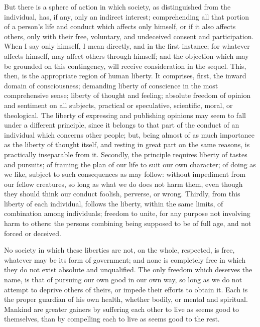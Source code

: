 \documentclass[11pt,openany]{book}
\begin{document}
But there is a sphere of action in which society, as distinguished from the individual, has, if any, only an indirect interest; comprehending all that portion of a person's life and conduct which affects only himself, or if it also affects others, only with their free, voluntary, and undeceived consent and participation. When I say only himself, I mean directly, and in the first instance; for whatever affects himself, may affect others through himself; and the objection which may be grounded on this contingency, will receive consideration in the sequel. This, then, is the appropriate region of human liberty. It comprises, first, the inward domain of consciousness; demanding liberty of conscience in the most comprehensive sense; liberty of thought and feeling; absolute freedom of opinion and sentiment on all subjects, practical or speculative, scientific, moral, or theological. The liberty of expressing and publishing opinions may seem to fall under a different principle, since it belongs to that part of the conduct of an individual which concerns other people; but, being almost of as much importance as the liberty of thought itself, and resting in great part on the same reasons, is practically inseparable from it. Secondly, the principle requires liberty of tastes and pursuits; of framing the plan of our life to suit our own character; of doing as we like, subject to such consequences as may follow: without impediment from our fellow creatures, so long as what we do does not harm them, even though they should think our conduct foolish, perverse, or wrong. Thirdly, from this liberty of each individual, follows the liberty, within the same limits, of combination among individuals; freedom to unite, for any purpose not involving harm to others: the persons combining being supposed to be of full age, and not forced or deceived.

No society in which these liberties are not, on the whole, respected, is free, whatever may be its form of government; and none is completely free in which they do not exist absolute and unqualified. The only freedom which deserves the name, is that of pursuing our own good in our own way, so long as we do not attempt to deprive others of theirs, or impede their efforts to obtain it. Each is the proper guardian of his own health, whether bodily, or mental and spiritual. Mankind are greater gainers by suffering each other to live as seems good to themselves, than by compelling each to live as seems good to the rest.
\end{document}
